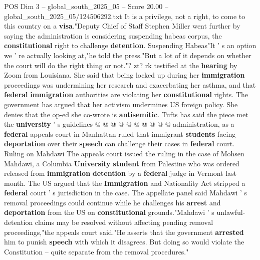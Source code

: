 \begin{textsample}{POS Dim 3 – global\_south\_2025\_05 – Score 20.00 – global\_south\_2025\_05/124506292.txt}
It is a privilege, not a right, to come to this country on a \textbf{visa}."Deputy Chief of Staff Stephen Miller went further by saying the administration is considering suspending habeas corpus, the \textbf{constitutional} right to challenge \textbf{detention}.
Suspending Habeas"It ' s an option we ' re actually looking at,"he told the press."But a lot of it depends on whether the court will do the right thing or not."? zt? rk testified at the \textbf{hearing} by Zoom from Louisiana.
She said that being locked up during her \textbf{immigration} proceedings was undermining her research and exacerbating her asthma, and that \textbf{federal} \textbf{immigration} authorities are violating her \textbf{constitutional} rights.
The government has argued that her activism undermines US foreign policy.
She denies that the op-ed she co-wrote is \textbf{antisemitic}.
Tufts has said the piece met the \textbf{university} ' s guidelines @ @ @ @ @ @ @ @ @ @ administration, as a \textbf{federal} appeals court in Manhattan ruled that immigrant \textbf{students} facing \textbf{deportation} over their \textbf{speech} can challenge their cases in \textbf{federal} court.
Ruling on Mahdawi The appeals court issued the ruling in the case of Mohsen Mahdawi, a Columbia \textbf{University} \textbf{student} from Palestine who was ordered released from \textbf{immigration} \textbf{detention} by a \textbf{federal} judge in Vermont last month.
The US argued that the \textbf{Immigration} and Nationality Act stripped a \textbf{federal} court ' s jurisdiction in the case.
The appellate panel said Mahdawi ' s removal proceedings could continue while he challenges his \textbf{arrest} and \textbf{deportation} from the US on \textbf{constitutional} grounds."Mahdawi ' s unlawful-detention claims may be resolved without affecting pending removal proceedings,"the appeals court said."He asserts that the government \textbf{arrested} him to punish \textbf{speech} with which it disagrees.
But doing so would violate the Constitution -- quite separate from the removal procedures."

\end{textsample}
